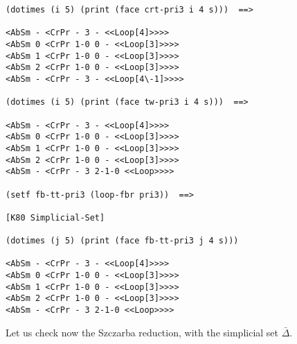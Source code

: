 \newpage
{\footnotesize\begin{verbatim}
(dotimes (i 5) (print (face crt-pri3 i 4 s)))  ==>

<AbSm - <CrPr - 3 - <<Loop[4]>>>>
<AbSm 0 <CrPr 1-0 0 - <<Loop[3]>>>>
<AbSm 1 <CrPr 1-0 0 - <<Loop[3]>>>>
<AbSm 2 <CrPr 1-0 0 - <<Loop[3]>>>>
<AbSm - <CrPr - 3 - <<Loop[4\-1]>>>>

(dotimes (i 5) (print (face tw-pri3 i 4 s)))  ==>

<AbSm - <CrPr - 3 - <<Loop[4]>>>>
<AbSm 0 <CrPr 1-0 0 - <<Loop[3]>>>>
<AbSm 1 <CrPr 1-0 0 - <<Loop[3]>>>>
<AbSm 2 <CrPr 1-0 0 - <<Loop[3]>>>>
<AbSm - <CrPr - 3 2-1-0 <<Loop>>>>

(setf fb-tt-pri3 (loop-fbr pri3))  ==>

[K80 Simplicial-Set]

(dotimes (j 5) (print (face fb-tt-pri3 j 4 s)))

<AbSm - <CrPr - 3 - <<Loop[4]>>>>
<AbSm 0 <CrPr 1-0 0 - <<Loop[3]>>>>
<AbSm 1 <CrPr 1-0 0 - <<Loop[3]>>>>
<AbSm 2 <CrPr 1-0 0 - <<Loop[3]>>>>
<AbSm - <CrPr - 3 2-1-0 <<Loop>>>>
\end{verbatim}}
Let us check now the Szczarba reduction, with the simplicial set $\bar{\Delta}$.
